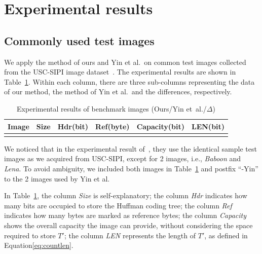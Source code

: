 \section{Experimental results}
\label{sec:experimental}

\subsection{Commonly used test images}

We apply the method of ours and Yin et al.\ on common test images collected from the USC-SIPI image dataset~\cite{UniversityofSouthernCalifornia2020}.
The experimental results are shown in Table~\ref{tab:common}. 
Within each column, there are three sub-columns representing the data of our method, the method of Yin et al.\ and the differences, respectively.

\begin{table}
	\scriptsize
	\centering
	\caption{Experimental results of benchmark images (Ours/Yin et~al./$\Delta$)}
	\label{tab:common}
	\begin{tabular}{l@{}c  @{\quad}  r@{/}r@{/}r  @{\quad} r@{/}r@{/}r  @{\quad} r@{/}r@{/}r  @{\quad} r@{/}r@{/}r }
		\toprule
		\multicolumn{1}{c}{Image} & Size & 
		\multicolumn{3}{c}{Hdr(bit)}            & \multicolumn{3}{c}{Ref(byte)}& \multicolumn{3}{c}{Capacity(bit)}& \multicolumn{3}{c}{LEN(bit)}      \\ 
		\midrule
		\deltatablesample
		\bottomrule
	\end{tabular}
\end{table}



We noticed that in the experimental result of~\cite{Yin2020}, they use the identical sample test images as we acquired from USC-SIPI, except for 2 images, i.e., \emph{Baboon} and \emph{Lena}. 
To avoid ambiguity, we included both images in Table~\ref{tab:common} and postfix ``-Yin'' to the 2 images used by Yin et al.

In Table~\ref{tab:common}, 
the column \emph{Size} is self-explanatory; 
the column \emph{Hdr} indicates how many bits are occupied to store the Huffman coding tree; 
the column \emph{Ref} indicates how many bytes are marked as reference bytes; 
the column \emph{Capacity} shows the overall capacity the image can provide, without considering the space required to store $T'$;
the column \emph{LEN} represents the length of $T'$, as defined in Equation\eqref{eq:countlen}.


